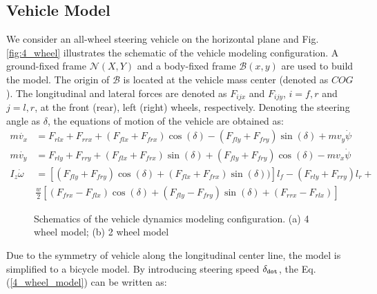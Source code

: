 \documentclass[conference, onecolumn]{IEEEtran}
\begin{document}
\subsection{Vehicle Model}
We consider an all-wheel steering vehicle on the horizontal plane and Fig.\ref{fig:4_wheel} illustrates the schematic of the vehicle modeling configuration. A ground-fixed frame $\mathcal{N}(X,Y)$ and a body-fixed frame $\mathcal{B}(x,y)$ are used to build the model. The origin of $\mathcal{B}$ is located at the vehicle mass center (denoted as $COG$).
The longitudinal and lateral forces are denoted as $F_{ijx}$ and $F_{ijy}$, $i=f, r$ and $j=l,r$, at the front (rear), left (right) wheels, respectively. Denoting the steering angle as $\delta$, the equations of motion of the vehicle are obtained as:
\begin{equation}\label{4_wheel_model}
	\begin{aligned}
		m\dot{v_x} & = F_{rlx}+F_{rrx}+(F_{flx}+F_{frx})\cos(\delta)  -(F_{fly}+F_{fry})\sin(\delta)+mv_y\dot\psi \\
		m\dot{v_y} & = F_{rly}+F_{rry}+(F_{flx}+F_{frx})\sin(\delta)  +(F_{fly}+F_{fry})\cos(\delta)-mv_x\dot{\psi}\\
		I_z\dot{\omega} & = \left[(F_{fly}+F_{fry})\cos(\delta)+(F_{flx}+F_{frx})\sin(\delta))\right]l_f  -(F_{rly}+F_{rry})l_r + \\ 
		& \frac{w}{2}[(F_{frx}-F_{flx})\cos(\delta)  +(F_{fly}-F_{fry})\sin(\delta)+(F_{rrx}-F_{rlx})]
	\end{aligned}
\end{equation}
\begin{figure}
	\label{fig:three graphs}
	\caption{Schematics of the vehicle dynamics modeling configuration. \newline  (a) 4 wheel model; (b) 2 wheel model}
\end{figure}
Due to the symmetry of vehicle along the longitudinal center line, the model is simplified to a bicycle model\cite{meywerk2015vehicle}. By introducing steering speed $\delta_{\tt dot}$, the Eq.(\ref{4_wheel_model}) can be written as:
\end{document}
